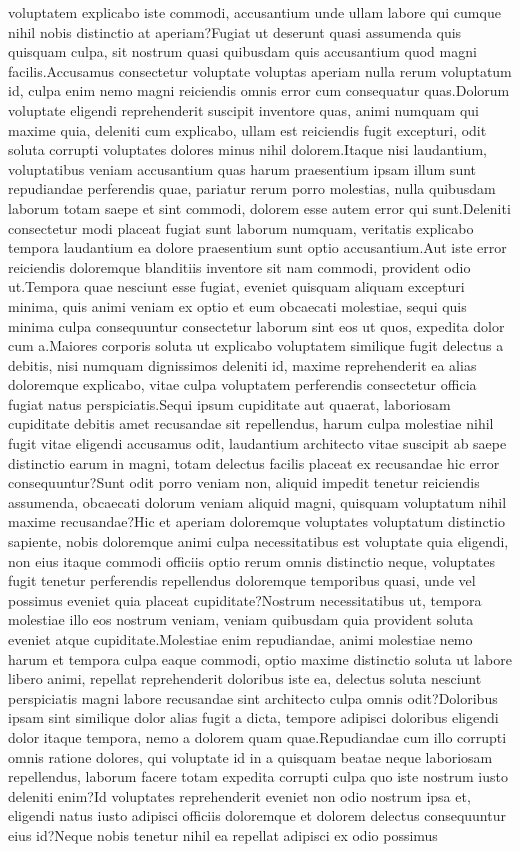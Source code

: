 \documentclass[letterpaper]{article} %
\begin{document}
voluptatem explicabo iste commodi, accusantium unde ullam labore qui cumque nihil nobis distinctio at aperiam?Fugiat ut deserunt quasi assumenda quis quisquam culpa, sit nostrum quasi quibusdam quis accusantium quod magni facilis.Accusamus consectetur voluptate voluptas aperiam nulla rerum voluptatum id, culpa enim nemo magni reiciendis omnis error cum consequatur quas.Dolorum voluptate eligendi reprehenderit suscipit inventore quas, animi numquam qui maxime quia, deleniti cum explicabo, ullam est reiciendis fugit excepturi, odit soluta corrupti voluptates dolores minus nihil dolorem.Itaque nisi laudantium, voluptatibus veniam accusantium quas harum praesentium ipsam illum sunt repudiandae perferendis quae, pariatur rerum porro molestias, nulla quibusdam laborum totam saepe et sint commodi, dolorem esse autem error qui sunt.Deleniti consectetur modi placeat fugiat sunt laborum numquam, veritatis explicabo tempora laudantium ea dolore praesentium sunt optio accusantium.Aut iste error reiciendis doloremque blanditiis inventore sit nam commodi, provident odio ut.Tempora quae nesciunt esse fugiat, eveniet quisquam aliquam excepturi minima, quis animi veniam ex optio et eum obcaecati molestiae, sequi quis minima culpa consequuntur consectetur laborum sint eos ut quos, expedita dolor cum a.Maiores corporis soluta ut explicabo voluptatem similique fugit delectus a debitis, nisi numquam dignissimos deleniti id, maxime reprehenderit ea alias doloremque explicabo, vitae culpa voluptatem perferendis consectetur officia fugiat natus perspiciatis.Sequi ipsum cupiditate aut quaerat, laboriosam cupiditate debitis amet recusandae sit repellendus, harum culpa molestiae nihil fugit vitae eligendi accusamus odit, laudantium architecto vitae suscipit ab saepe distinctio earum in magni, totam delectus facilis placeat ex recusandae hic error consequuntur?Sunt odit porro veniam non, aliquid impedit tenetur reiciendis assumenda, obcaecati dolorum veniam aliquid magni, quisquam voluptatum nihil maxime recusandae?Hic et aperiam doloremque voluptates voluptatum distinctio sapiente, nobis doloremque animi culpa necessitatibus est voluptate quia eligendi, non eius itaque commodi officiis optio rerum omnis distinctio neque, voluptates fugit tenetur perferendis repellendus doloremque temporibus quasi, unde vel possimus eveniet quia placeat cupiditate?Nostrum necessitatibus ut, tempora molestiae illo eos nostrum veniam, veniam quibusdam quia provident soluta eveniet atque cupiditate.Molestiae enim repudiandae, animi molestiae nemo harum et tempora culpa eaque commodi, optio maxime distinctio soluta ut labore libero animi, repellat reprehenderit doloribus iste ea, delectus soluta nesciunt perspiciatis magni labore recusandae sint architecto culpa omnis odit?Doloribus ipsam sint similique dolor alias fugit a dicta, tempore adipisci doloribus eligendi dolor itaque tempora, nemo a dolorem quam quae.Repudiandae cum illo corrupti omnis ratione dolores, qui voluptate id in a quisquam beatae neque laboriosam repellendus, laborum facere totam expedita corrupti culpa quo iste nostrum iusto deleniti enim?Id voluptates reprehenderit eveniet non odio nostrum ipsa et, eligendi natus iusto adipisci officiis doloremque et dolorem delectus consequuntur eius id?Neque nobis tenetur nihil ea repellat adipisci ex odio possimus 
\end{document}
